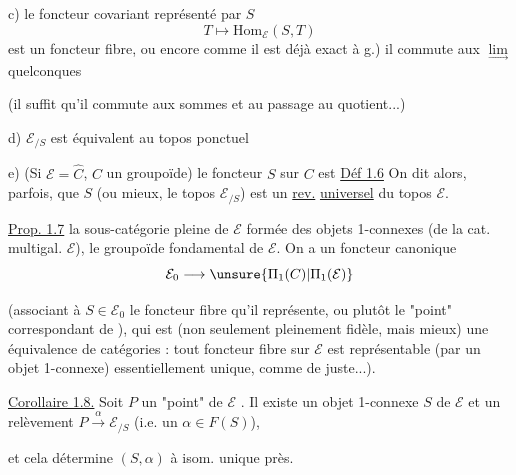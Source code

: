c) le foncteur covariant représenté par \(S\)
\[
T\longmapsto\mathrm{Hom}_{\mathcal E}(S,T)
\]
est un foncteur fibre, ou encore
comme il est déjà exact à g.) il commute aux
\(\underset{\longrightarrow}{\lim}\) quelconques

 (il suffit qu'il commute aux sommes et au passage
au quotient...)

d) \(\mathcal E_{/S}\) est équivalent au topos ponctuel

e) (Si \(\mathcal E=\widehat C\), \(C\) un groupoïde) le foncteur
\(S\) sur \(C\) est 
\uline{Déf 1.6} On dit alors, parfois, que \(S\) (ou mieux, le topos
\(\mathcal E_{/S}\)) est un \uline{rev.} \uline{universel} du topos
 \(\mathcal E\).

\uline{Prop. 1.7}
 la sous-catégorie pleine de
\(\mathcal E\) formée des objets 1-connexes
(de la cat. multigal. \(\mathcal E\)),
 
le groupoïde fondamental 
 de \(\mathcal E\).
On a un foncteur canonique
\[
\mathcal E_0\longrightarrow
\unsure{\Pi_1(C)|\Pi_1(\mathcal E)}
\]

(associant à  \(S\in\mathcal E_0\)
le foncteur fibre qu'il représente, ou plutôt le "point" correspondant
de ), qui est
(non seulement pleinement fidèle, mais mieux) une équivalence de
catégories : tout foncteur fibre sur \(\mathcal E\) est représentable
(par un objet 1-connexe) essentiellement unique, comme de juste...).

\uline{Corollaire 1.8.} Soit \(P\) un "point" de \(\mathcal E\)
.
Il existe un objet 1-connexe \(S\) de \(\mathcal E\) et un relèvement
\(P\xrightarrow{\alpha}\mathcal E_{/S}\)
(i.e. un \(\alpha\in F(S)\)),


et cela détermine \((S,\alpha)\) à isom. unique près.

